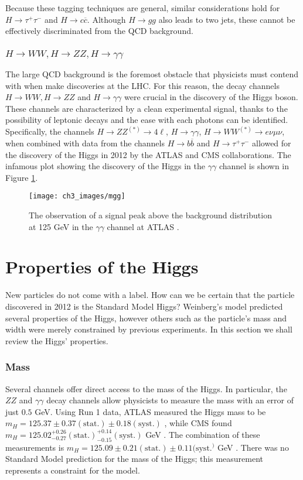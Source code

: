 \documentclass[10pt,a4paper]{book}
\begin{document}
Because these tagging techniques are general, similar considerations hold for $H \rightarrow \tau^+ \tau^-$ and $H \rightarrow c \overline{c}$. Although $H \rightarrow g g$ also leads to two jets, these cannot be effectively discriminated from the QCD background.

\subsubsection{$H\rightarrow WW, H\rightarrow ZZ, H\rightarrow \gamma\gamma$}
The large QCD background is the foremost obstacle that physicists must contend with when make discoveries at the LHC. For this reason, the decay channels  
$H\rightarrow WW, H\rightarrow ZZ$ and $H\rightarrow \gamma\gamma$ were crucial in the discovery of the Higgs boson. These channels are characterized by a clean experimental signal, thanks to the possibility of leptonic decays and the ease with each photons can be identified. Specifically, the channels $H\rightarrow ZZ^{(*)}\rightarrow 4\ell$, $H\rightarrow\gamma\gamma$, $H\rightarrow WW^{(*)} \rightarrow e\nu\mu\nu$, when combined with data from the channels $H\rightarrow b\overline{b}$ and $H \rightarrow \tau^+ \tau^-$ allowed for the discovery of the Higgs in 2012 by the ATLAS and CMS collaborations. The infamous plot showing the discovery of the Higgs in the $\gamma\gamma$ channel is shown in Figure \ref{mgg}.

\begin{figure}
\centering
\texttt{[image: ch3\_images/mgg]}
\caption{The observation of a signal peak above the background distribution at 125 GeV in the $\gamma\gamma$ channel at ATLAS \cite{ATLAS:2012yve}.}
\label{mgg}
\end{figure}

\section{Properties of the Higgs}
New particles do not come with a label. How can we be certain that the particle discovered in 2012 is the Standard Model Higgs? Weinberg's model predicted several properties of the Higgs, however others such as the particle's mass and width were merely constrained by previous experiments. In this section we shall review the Higgs' properties.

\subsubsection{Mass}
Several channels offer direct access to the mass of the Higgs. In particular, the $ZZ$ and $\gamma\gamma$ decay channels allow physicists to measure the mass with an error of just $0.5$ GeV. Using Run 1 data, ATLAS measured the Higgs mass to be $m_H = 125.37 \pm 0.37(\text{stat.}) \pm 0.18(\text{syst.})$ \cite{ATLAS:2014euz}, while CMS found $m_H = 125.02^{+0.26}_{-0.27}(\text{stat.})^{+0.14}_{-0.15}(\text{syst.})$ GeV \cite{CMS:2014fzn}. The combination of these measurements is $m_H = 125.09 \pm 0.21(\text{stat.})\pm 0.11(\text{syst.}^)$ GeV \cite{ATLAS:2015yey}.  There was no Standard Model prediction for the mass of the Higgs; this measurement represents a constraint for the model.
\end{document}

